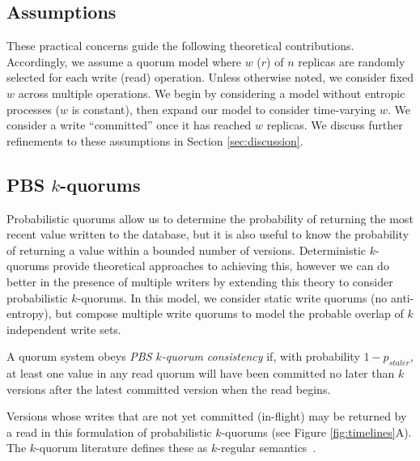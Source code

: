 \documentclass{vldb}
\begin{document}
\subsection{Assumptions}

These practical concerns guide the following theoretical
contributions.  Accordingly, we assume a quorum model where $w$ ($r$)
of $n$ replicas are randomly selected for each write (read) operation.
Unless otherwise noted, we consider fixed $w$ across multiple
operations.  We begin by considering a model without entropic
processes ($w$ is constant), then expand our model to consider
time-varying $w$. We consider a write ``committed'' once it has
reached $w$ replicas. We discuss further refinements to these
assumptions in Section \ref{sec:discussion}.

\subsection{PBS $k$-quorums}

Probabilistic quorums allow us to determine the probability of
returning the most recent value written to the database, but it is
also useful to know the probability of returning a value within a
bounded number of versions.  Deterministic $k$-quorums provide
theoretical approaches to achieving this, however we can do better in
the presence of multiple writers by extending this theory to consider
probabilistic $k$-quorums.  In this model, we consider static write
quorums (no anti-entropy), but compose multiple write quorums to model the probable overlap of $k$ independent write sets.
\begin{definition}
A quorum system obeys \textit{PBS $k$-quorum consistency} if, with
probability $1-p_{staler}$, at least one value in any read quorum will
have been committed no later than $k$ versions after the latest committed
version when the read begins.
\end{definition}
Versions whose writes that are not yet committed (in-flight) may be
returned by a read in this formulation of probabilistic $k$-quorums
(see Figure \ref{fig:timelines}A).  The $k$-quorum literature defines these as $k$-regular semantics~\cite{nonstrict-availability}.
\end{document}
